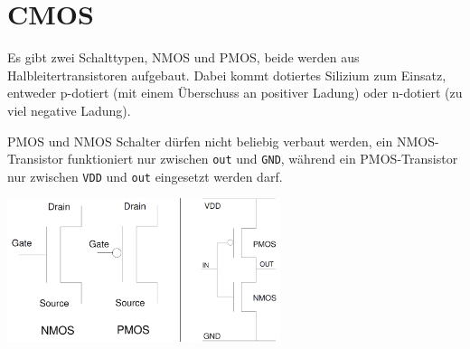 \section{CMOS}
	\begin{multicols}{2}
			Es gibt zwei Schalttypen, NMOS und PMOS, beide werden aus Halbleitertransistoren aufgebaut.
			Dabei kommt dotiertes Silizium zum Einsatz, entweder p-dotiert (mit einem Überschuss an positiver Ladung)
			oder n-dotiert (zu viel negative Ladung).
			
			PMOS und NMOS Schalter dürfen nicht beliebig verbaut werden, ein NMOS-Transistor funktioniert nur zwischen
			\verb+out+ und \verb+GND+, während ein PMOS-Transistor nur zwischen \verb+VDD+ und \verb+out+ eingesetzt werden darf.
			
			\begin{center}
			\includegraphics[width = 8cm]{images/mem/cmos.png}
			\end{center}
	\end{multicols}


















